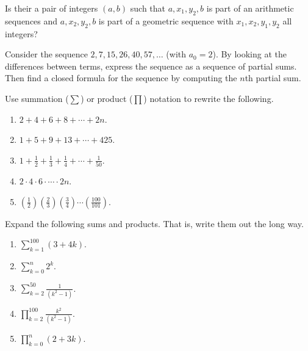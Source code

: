 \documentclass[11pt,]{book}
\theoremstyle{ptxplainnotitle}
\theoremstyle{ptxplaintitle}
\theoremstyle{ptxdefinitionnotitle}
\theoremstyle{ptxdefinitiontitle}
\theoremstyle{ptxdefinitionnotitle}
\theoremstyle{ptxdefinitiontitle}
\theoremstyle{ptxdefinitionnotitle}
\theoremstyle{ptxdefinitiontitle}
\theoremstyle{ptxdefinitiontitlenonumber}
\theoremstyle{ptxdefinitiontitlenonumber}
\numberwithin{equation}{chapter}
\renewcommand{\d}{\displaystyle}
\begin{document}
\begin{divisionexercise}{10}\hypertarget{exercise-22}{}
\hypertarget{p-317}{}%
Is their a pair of integers \((a,b)\) such that \(a, x_1, y_2, b\) is part of an arithmetic sequences and \(a, x_2, y_2, b\) is part of a geometric sequence with \(x_1, x_2, y_1, y_2\) all integers?%
\end{divisionexercise}%
\begin{divisionexercise}{11}\hypertarget{exercise-23}{}
\hypertarget{p-318}{}%
Consider the sequence \(2, 7, 15, 26, 40, 57, \ldots\) (with \(a_0 = 2\)). By looking at the differences between terms, express the sequence as a sequence of partial sums. Then find a closed formula for the sequence by computing the \(n\)th partial sum.%
\end{divisionexercise}%
\begin{divisionexercise}{12}\hypertarget{exercise-24}{}
\hypertarget{p-320}{}%
Use summation (\(\sum\)) or product (\(\prod\)) notation to rewrite the following. \leavevmode%
\begin{enumerate}[label=(\alph*)]
\item\hypertarget{li-164}{}\(2 + 4 + 6 + 8 + \cdots + 2n\).%
\item\hypertarget{li-165}{}\(1 + 5 + 9 + 13 + \cdots + 425\).%
\item\hypertarget{li-166}{}\(1 + \frac{1}{2} + \frac{1}{3} + \frac{1}{4} + \cdots + \frac{1}{50}\).%
\item\hypertarget{li-167}{}\(2 \cdot 4 \cdot 6 \cdot \cdots \cdot 2n\).%
\item\hypertarget{li-168}{}\((\frac{1}{2})(\frac{2}{3})(\frac{3}{4})\cdots(\frac{100}{101})\).%
\end{enumerate}
%
\end{divisionexercise}%
\begin{divisionexercise}{13}\hypertarget{exercise-25}{}
\hypertarget{p-322}{}%
Expand the following sums and products. That is, write them out the long way. \leavevmode%
\begin{enumerate}[label=(\alph*)]
\item\hypertarget{li-174}{}\(\d\sum_{k=1}^{100} (3+4k)\).%
\item\hypertarget{li-175}{}\(\d\sum_{k=0}^n 2^k\).%
\item\hypertarget{li-176}{}\(\d\sum_{k=2}^{50}\frac{1}{(k^2 - 1)}\).%
\item\hypertarget{li-177}{}\(\d\prod_{k=2}^{100}\frac{k^2}{(k^2-1)}\).%
\item\hypertarget{li-178}{}\(\d\prod_{k=0}^n (2+3k)\).%
\end{enumerate}
%
\end{divisionexercise}%
\end{document}
